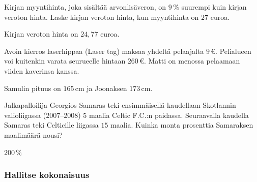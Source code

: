 \begin{tehtavasivu}
\begin{tehtava}
    Kirjan myyntihinta, joka sisältää arvonlisäveron, on $9\,\%$ suurempi kuin kirjan veroton hinta. Laske kirjan veroton hinta, kun myyntihinta on $27$ euroa.
    \begin{vastaus}
        Kirjan veroton hinta on $24,77$ euroa.
    \end{vastaus}
\end{tehtava}

\begin{tehtava}
	Avoin kierros laserhippaa (Laser tag) maksaa yhdeltä pelaajalta $9$\,€. Pelialueen voi kuitenkin varata seurueelle hintaan $260$\,€. Matti on menossa pelaamaan viiden kaverinsa kanssa. 
	\begin{vastaus}
	\end{vastaus}

\end{tehtava}

\begin{tehtava}
    Samulin pituus on $165$\,cm ja Joonaksen $173$\,cm.
    \begin{vastaus}
    \end{vastaus}
\end{tehtava}

\begin{tehtava}
    Jalkapalloilija Georgios Samaras teki ensimmäisellä kaudellaan Skotlannin valioliigassa (2007--2008)
    $5$ maalia Celtic F.C.:n paidassa. Seuraavalla kaudella Samaras teki Celticille liigassa $15$ maalia.
    Kuinka monta prosenttia Samaraksen maalimäärä nousi?
    \begin{vastaus}
        $200\,\%$
    \end{vastaus}
\end{tehtava}

\subsubsection*{Hallitse kokonaisuus}


\end{tehtavasivu}
